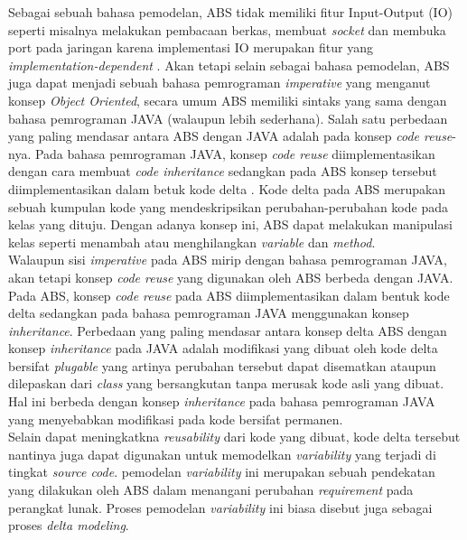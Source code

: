 Sebagai sebuah bahasa pemodelan, ABS tidak memiliki fitur Input-Output (IO) seperti misalnya melakukan pembacaan berkas, membuat \textit{socket} dan membuka port pada jaringan karena implementasi IO merupakan fitur yang \textit{implementation-dependent} \citep{hahnle2013abstract}. Akan tetapi selain sebagai bahasa pemodelan, ABS juga dapat menjadi sebuah bahasa pemrograman \textit{imperative} yang menganut konsep \textit{Object Oriented}, secara umum ABS memiliki sintaks yang sama dengan bahasa pemrograman JAVA (walaupun lebih sederhana). Salah satu perbedaan yang paling mendasar antara ABS dengan JAVA adalah pada konsep \textit{code reuse}-nya. Pada bahasa pemrograman JAVA, konsep \textit{code reuse} diimplementasikan dengan cara membuat \textit{code inheritance} sedangkan pada ABS konsep tersebut diimplementasikan dalam betuk kode delta \citep{hahnle2013hats}. Kode delta pada ABS merupakan sebuah kumpulan kode yang mendeskripsikan perubahan-perubahan kode pada kelas yang dituju. Dengan adanya konsep ini, ABS dapat melakukan manipulasi kelas seperti menambah atau menghilangkan \textit{variable} dan \textit{method}. \\

Walaupun sisi \textit{imperative} pada ABS mirip dengan bahasa pemrograman JAVA, akan tetapi konsep \textit{code reuse} yang digunakan oleh ABS berbeda dengan JAVA. Pada ABS, konsep \textit{code reuse} pada ABS diimplementasikan dalam bentuk kode delta sedangkan pada bahasa pemrograman JAVA menggunakan konsep \textit{inheritance}. Perbedaan yang paling mendasar antara konsep delta ABS dengan konsep \textit{inheritance} pada JAVA adalah modifikasi yang dibuat oleh kode delta bersifat \textit{plugable} yang artinya perubahan tersebut dapat disematkan ataupun dilepaskan dari \textit{class} yang bersangkutan tanpa merusak kode asli yang dibuat. Hal ini berbeda dengan konsep \textit{inheritance} pada bahasa pemrograman JAVA yang menyebabkan modifikasi pada kode bersifat permanen.\\

Selain dapat meningkatkna \textit{reusability} dari kode yang dibuat, kode delta tersebut nantinya juga dapat digunakan untuk memodelkan \textit{variability} yang terjadi di tingkat \textit{source code}. pemodelan \textit{variability} ini merupakan sebuah pendekatan yang dilakukan oleh ABS dalam menangani perubahan \textit{requirement} pada perangkat lunak. Proses pemodelan \textit{variability} ini biasa disebut juga sebagai proses \textit{delta modeling}. \\

